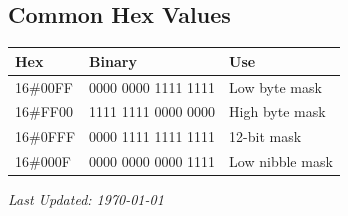 \documentclass[11pt,a4paper]{article}
\begin{document}
\subsection*{Common Hex Values}

\begin{table}[h]
\centering
\begin{tabular}{@{}lll@{}}
\toprule
\textbf{Hex} & \textbf{Binary} & \textbf{Use} \\
\midrule
16\#00FF & 0000 0000 1111 1111 & Low byte mask \\
16\#FF00 & 1111 1111 0000 0000 & High byte mask \\
16\#0FFF & 0000 1111 1111 1111 & 12-bit mask \\
16\#000F & 0000 0000 0000 1111 & Low nibble mask \\
\bottomrule
\end{tabular}
\end{table}

\vfill

\begin{center}
\textit{Last Updated: \today}
\end{center}
\end{document}
